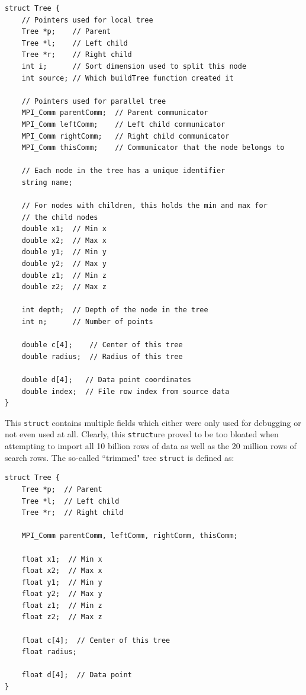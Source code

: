 \documentclass{article}
\begin{document}
\begin{minipage}{\linewidth}
\lstset{language=C++, keepspaces=true}
\begin{lstlisting}
struct Tree {
    // Pointers used for local tree
	Tree *p;    // Parent
	Tree *l;    // Left child
	Tree *r;    // Right child
	int i;      // Sort dimension used to split this node
	int source; // Which buildTree function created it

    // Pointers used for parallel tree
	MPI_Comm parentComm;  // Parent communicator
	MPI_Comm leftComm;    // Left child communicator
	MPI_Comm rightComm;   // Right child communicator
	MPI_Comm thisComm;    // Communicator that the node belongs to

    // Each node in the tree has a unique identifier
	string name;

    // For nodes with children, this holds the min and max for
    // the child nodes
	double x1;  // Min x
	double x2;  // Max x
	double y1;  // Min y
	double y2;  // Max y
	double z1;  // Min z
	double z2;  // Max z

	int depth;  // Depth of the node in the tree
	int n;      // Number of points

	double c[4];    // Center of this tree
	double radius;  // Radius of this tree

	double d[4];   // Data point coordinates
	double index;  // File row index from source data
}
\end{lstlisting}
\end{minipage}


This \texttt{struct} contains multiple fields which either were only used for debugging or not even used at all. Clearly, this \texttt{struct}ure proved to be too bloated when attempting to import all 10 billion rows of data as well as the 20 million rows of search rows. The so-called ``trimmed" tree \texttt{struct} is defined as:

\begin{minipage}{\linewidth}
\lstset{language=C++, keepspaces=true}
\begin{lstlisting}
struct Tree {
	Tree *p;  // Parent
	Tree *l;  // Left child
	Tree *r;  // Right child

	MPI_Comm parentComm, leftComm, rightComm, thisComm;

	float x1;  // Min x
	float x2;  // Max x
	float y1;  // Min y
	float y2;  // Max y
	float z1;  // Min z
	float z2;  // Max z

	float c[4];  // Center of this tree
	float radius;

	float d[4];  // Data point
}
\end{lstlisting}
\end{minipage}
\end{document}
